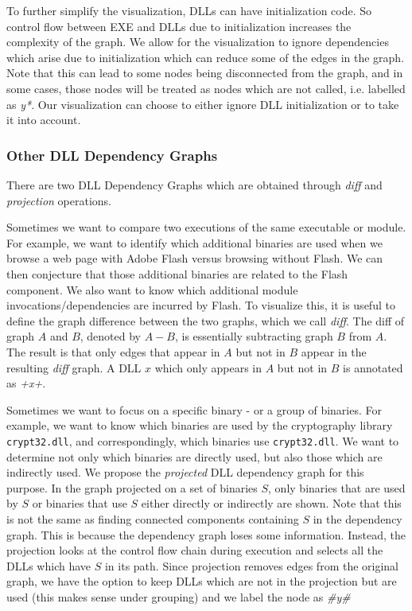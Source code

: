 To further simplify the visualization, DLLs can have initialization code.
So control flow between EXE and DLLs due to initialization increases
the complexity of the graph. We allow for the visualization to ignore
dependencies which arise due to initialization which can reduce some
of the edges in the graph.
Note that this can lead to some nodes being disconnected from the graph,
and in some cases, those nodes will be treated as nodes which are not called,
i.e. labelled as {\it *y*}.
Our visualization can choose to either ignore DLL initialization or 
to take it into account.

\subsubsection{Other DLL Dependency Graphs}

There are two DLL Dependency Graphs
which are obtained through {\em diff} and {\em projection} operations.

Sometimes we want to compare two executions of the same executable or
module.
For example, we want to identify which additional binaries are used when
we browse a web page with Adobe Flash versus browsing without Flash. 
We can then conjecture that those additional binaries are related to the
Flash component.
We also want to know which additional module invocations/dependencies
are incurred by Flash.
To visualize this, 
it is useful to define the graph difference between the two graphs,
which we call {\em diff}.
The diff of graph $A$ and $B$, denoted by $A-B$, 
is essentially subtracting graph $B$ from $A$.
The result is that only edges that appear in $A$ but not in $B$ appear
in the resulting {\em diff} graph.
A DLL $x$ which only appears in $A$ but not in $B$ is annotated
as {\it +x+}.

Sometimes we want to focus on a specific binary - or a group of binaries.
For example, we want to know which binaries are used by the cryptography
library {\tt crypt32.dll}, and correspondingly,
which binaries use {\tt crypt32.dll}.
We want to determine not only which binaries are directly used, 
but also those which are indirectly used.
We propose the {\em projected} DLL dependency graph for this purpose.
In the graph projected on a set of binaries $S$,
only binaries that are used by $S$ or binaries that use $S$ either directly
or indirectly are shown.
Note that this is not the same as finding connected components containing
$S$ in the dependency graph. 
This is because the dependency graph loses some information. 
Instead, the projection looks at the control flow chain during
execution and selects all the DLLs which have $S$ in its path.
Since projection removes edges from the original graph, we have the
option to keep DLLs which are not in the projection but are used 
(this makes sense under grouping) and we label the node as {\it \#y\#}

